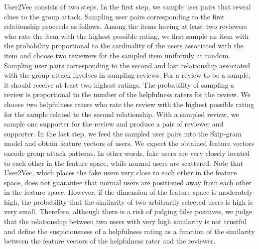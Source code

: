 \documentclass[master,english,final]{kaist-ucs}
\begin{document}
User2Vec consists of two steps.
In the first step, we sample user pairs that reveal clues to the group attack.
Sampling user pairs corresponding to the first relationship proceeds as follows.
Among the items having at least two reviewers who rate the item with the highest possible rating, we first sample an item with the probability proportional to the cardinality of the users associated with the item and choose two reviewers for the sampled item uniformly at random.
Sampling user pairs corresponding to the second and last relationship associated with the group attack involves in sampling reviews.
For a review to be a sample, it should receive at least two highest ratings.
The probability of sampling a review is proportional to the number of the helpfulness raters for the review.
We choose two helpfulness raters who rate the review with the highest possible rating for the sample related to the second relationship.
With a sampled review, we sample one supporter for the review and produce a pair of reviewer and supporter.
In the last step, we feed the sampled user pairs into the Skip-gram model and obtain feature vectors of users.
We expect the obtained feature vectors encode group attack patterns.
In other words, fake users are very closely located to each other in the feature space, while normal users are scattered.
Note that User2Vec, which places the fake users very close to each other in the feature space, does not guarantee that normal users are positioned away from each other in the feature space.
However, if the dimension of the feature space is moderately high, the probability that the similarity of two arbitrarily selected users is high is very small.
Therefore, although there is a risk of judging false positives, we judge that the relationship between two users with very high similarity is not trustful and define the suspiciousness of a helpfulness rating as a function of the similarity between the feature vectors of the helpfulness rater and the reviewer.


\end{document}
